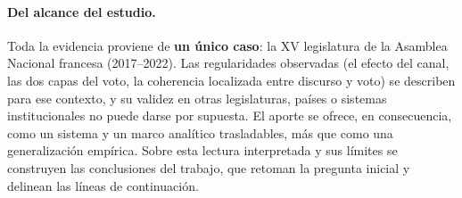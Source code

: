 \paragraph{Del alcance del estudio.}
Toda la evidencia proviene de \textbf{un único caso}: la XV legislatura de la
Asamblea Nacional francesa (2017--2022). Las regularidades observadas (el efecto
del canal, las dos capas del voto, la coherencia localizada entre discurso y
voto) se describen para ese contexto, y su validez en otras legislaturas, países
o sistemas institucionales no puede darse por supuesta. El aporte se ofrece, en
consecuencia, como un sistema y un marco analítico trasladables, más que como una
generalización empírica. Sobre esta lectura interpretada y sus límites se
construyen las conclusiones del trabajo, que retoman la pregunta inicial y
delinean las líneas de continuación.
